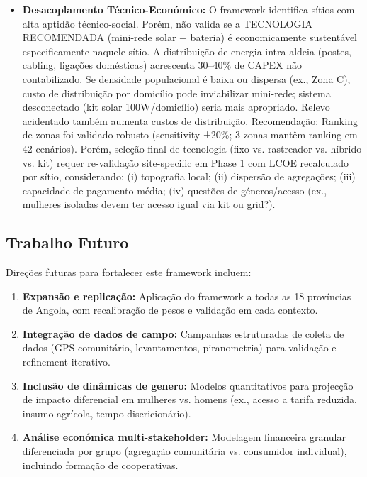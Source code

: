\documentclass[12pt, a4paper]{article}
\begin{document}
\begin{itemize}
\begin{itemize}
\item \textbf{Desacoplamento Técnico-Económico:} O framework identifica sítios com alta aptidão técnico-social. Porém, não valida se a TECNOLOGIA RECOMENDADA (mini-rede solar + bateria) é economicamente sustentável especificamente naquele sítio. A distribuição de energia intra-aldeia (postes, cabling, ligações domésticas) acrescenta 30--40\% de CAPEX não contabilizado. Se densidade populacional é baixa ou dispersa (ex., Zona C), custo de distribuição por domicílio pode inviabilizar mini-rede; sistema desconectado (kit solar 100W/domicílio) seria mais apropriado. Relevo acidentado também aumenta custos de distribuição. Recomendação: Ranking de zonas foi validado robusto (sensitivity ±20\%; 3 zonas mantêm ranking em 42 cenários). Porém, seleção final de tecnologia (fixo vs. rastreador vs. híbrido vs. kit) requer re-validação site-specific em Phase 1 com LCOE recalculado por sítio, considerando: (i) topografia local; (ii) dispersão de agregações; (iii) capacidade de pagamento média; (iv) questões de géneros/acesso (ex., mulheres isoladas devem ter acesso igual via kit ou grid?).

\end{itemize}

\subsection{Trabalho Futuro}

Direções futuras para fortalecer este framework incluem:

\begin{enumerate}

\item \textbf{Expansão e replicação:} Aplicação do framework a todas as 18 províncias de Angola, com recalibração de pesos e validação em cada contexto.

\item \textbf{Integração de dados de campo:} Campanhas estruturadas de coleta de dados (GPS comunitário, levantamentos, piranometria) para validação e refinement iterativo.

\item \textbf{Inclusão de dinâmicas de genero:} Modelos quantitativos para projecção de impacto diferencial em mulheres vs. homens (ex., acesso a tarifa reduzida, insumo agrícola, tempo discricionário).

\item \textbf{Análise económica multi-stakeholder:} Modelagem financeira granular diferenciada por grupo (agregação comunitária vs. consumidor individual), incluindo formação de cooperativas.


\end{enumerate}
\end{itemize}
\end{document}
